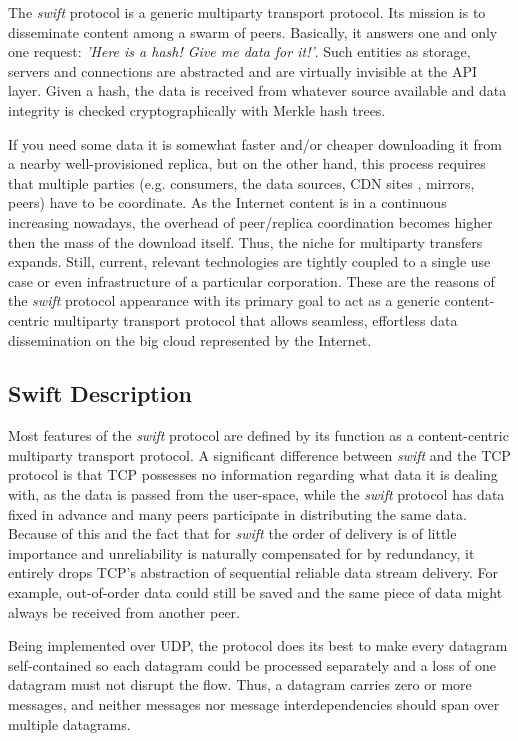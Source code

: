 
The \emph{swift} protocol is a generic multiparty transport protocol. Its mission is to disseminate content among a 
swarm of peers. Basically, it answers one and only one request: \emph{'Here is a hash! Give me data for it!'}. Such
entities as storage, servers and connections are abstracted and are virtually invisible at the API layer. Given a hash,
the data is received from whatever source available and data integrity is checked cryptographically with Merkle hash
trees.

If you need some data it is somewhat faster and/or cheaper downloading it from a nearby well-provisioned replica, but 
on the other hand, this process requires that multiple parties (e.g. consumers, the data sources, CDN
sites\cite{cdnwiki} , mirrors, peers) have to be coordinate. As the Internet content  is in a continuous increasing
nowadays, the overhead of peer/replica coordination becomes higher then the mass of the download itself. Thus, the niche
for multiparty transfers expands. Still, current, relevant technologies are tightly coupled to a single use case or even
infrastructure of a particular corporation. These are the reasons of the \emph{swift} protocol appearance with its
primary goal to act as a generic content-centric multiparty transport protocol that allows seamless, effortless data
dissemination on the big cloud represented by the Internet.

\subsection{Swift Description}

Most features of the \emph{swift} protocol are defined by its function as a content-centric multiparty transport 
protocol. A significant difference between \emph{swift} and the TCP protocol is that TCP possesses no information
regarding what data it is dealing with, as the data is passed from the user-space, while the \emph{swift} protocol has
data fixed in advance and many peers participate in distributing the same data. Because of this and the fact that for
\emph{swift} the order of delivery is of little importance and unreliability is naturally compensated for by redundancy,
it entirely drops TCP's abstraction of sequential reliable data stream delivery. For example, out-of-order data could
still be saved and the same piece of data might always be received from another peer.

Being implemented over UDP, the protocol does its best to make every datagram self-contained so each datagram could be 
processed separately and a loss of one datagram must not disrupt the flow. Thus, a datagram carries zero or more
messages, and neither messages nor message interdependencies should span over multiple datagrams. 

